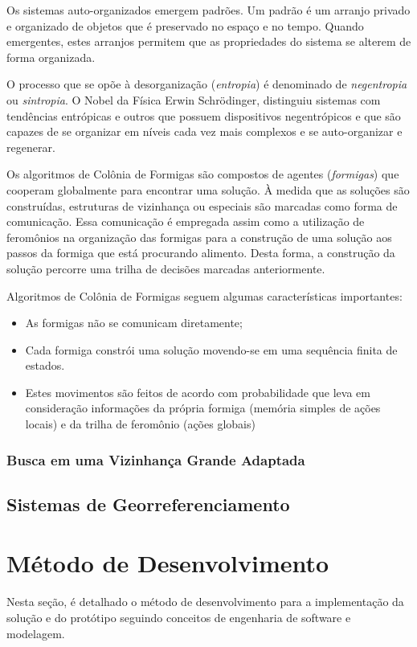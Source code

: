 Os sistemas auto-organizados emergem padrões. Um padrão é um arranjo privado e organizado de objetos que é preservado no espaço e no tempo. Quando emergentes, estes arranjos permitem que as propriedades do sistema se alterem de forma organizada.

O processo que se opõe à desorganização (\emph{entropia}) é denominado de \emph{negentropia} ou \emph{sintropia}. O Nobel da Física Erwin Schrödinger, distinguiu sistemas com tendências entrópicas e outros que possuem dispositivos negentrópicos e que são capazes de se organizar em níveis cada vez mais complexos e se auto-organizar e regenerar. 

Os algoritmos de Colônia de Formigas são compostos de agentes (\emph{formigas}) que cooperam globalmente para encontrar uma solução. À medida que as soluções são construídas, estruturas de vizinhança ou especiais são marcadas como forma de comunicação. Essa comunicação é empregada assim como a utilização de feromônios na organização das formigas para a construção de uma solução aos passos da formiga que está procurando alimento. Desta forma, a construção da solução percorre uma trilha de decisões marcadas anteriormente.

Algoritmos de Colônia de Formigas seguem algumas características importantes:
\begin{itemize}
    \item As formigas não se comunicam diretamente;
    \item Cada formiga constrói uma solução movendo-se em uma sequência finita de estados.
    \item Estes movimentos são feitos de acordo com probabilidade que leva em consideração informações da própria formiga (memória simples de ações locais) e da trilha de feromônio (ações globais)
\end{itemize}



\subsubsection{Busca em uma Vizinhança Grande Adaptada}

\subsection{Sistemas de Georreferenciamento}\label{georreferenciamento}

\section{Método de Desenvolvimento}
\label{metodo-desenvolvimento}
Nesta seção, é detalhado o método de desenvolvimento para a implementação da solução e do protótipo seguindo conceitos de engenharia de software e modelagem.

